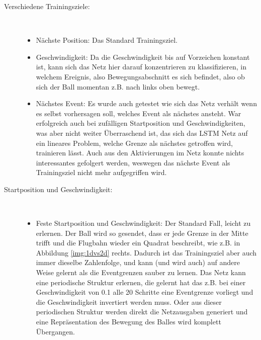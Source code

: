 \begin{description}
	\item[Verschiedene Trainingsziele:] \hfill \\
	\begin{itemize}
	
	\item Nächste Position: Das Standard Trainingsziel.
	\item Geschwindigkeit: Da die Geschwindigkeit bis auf Vorzeichen konstant ist, kann sich das Netz hier darauf konzentrieren zu klassifizieren, in welchem Ereignis, also Bewegungsabschnitt es sich befindet, also ob sich der Ball momentan z.B. nach links oben bewegt.  
	\item Nächstes Event: Es wurde auch getestet wie sich das Netz verhält wenn es selbst vorhersagen soll, welches Event als nächstes ansteht. War erfolgreich auch bei zufälligen Startposition und Geschwindigkeiten, was aber nicht weiter Überraschend ist, das sich das LSTM Netz auf ein lineares Problem, welche Grenze als nächstes getroffen wird, trainieren lässt. Auch aus den Aktivierungen im Netz konnte nichts interessantes gefolgert werden, weswegen das nächste Event als Trainingsziel nicht mehr aufgegriffen wird. 
	
\end{itemize}
	\item[Startposition und Geschwindigkeit:]\hfill \\
	\begin{itemize}
		\item Feste Startposition und Geschwindigkeit: Der Standard Fall, leicht zu erlernen. Der Ball wird so gesendet, dass er jede Grenze in der Mitte trifft und die Flugbahn wieder ein Quadrat beschreibt, wie z.B. in Abbildung \ref{img:1dvs2d} rechts. Dadurch ist das Trainingsziel aber auch immer dieselbe Zahlenfolge, und kann (und wird auch) auf andere Weise gelernt als die Eventgrenzen sauber zu lernen. Das Netz kann eine periodische Struktur erlernen, die gelernt hat das z.B. bei einer Geschwindigkeit von 0.1 alle 20 Schritte eine Eventgrenze vorliegt und die Geschwindigkeit invertiert werden muss. Oder aus dieser periodischen Struktur werden direkt die Netzausgaben generiert und eine Repräsentation des Bewegung des Balles wird komplett Übergangen. 
		

\end{itemize}
\end{description}
